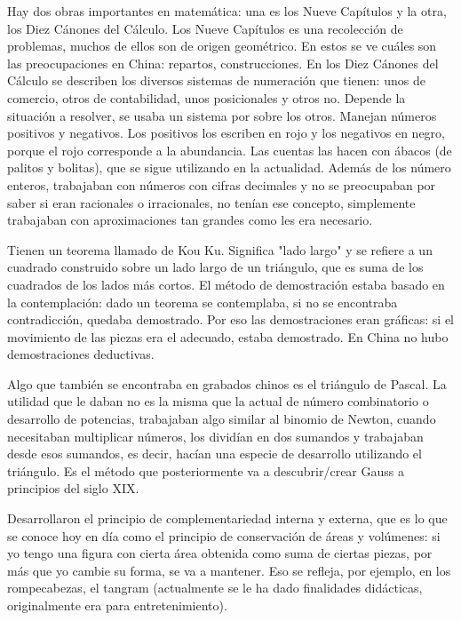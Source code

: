 Hay dos obras importantes en matemática: una es los Nueve Capítulos y la otra, los Diez Cánones del Cálculo. Los Nueve Capítulos es una recolección de problemas, muchos de ellos son de origen geométrico. En estos se ve cuáles son las preocupaciones en China: repartos, construcciones. En los Diez Cánones del Cálculo se describen los diversos sistemas de numeración que tienen: unos de comercio, otros de contabilidad, unos posicionales y otros no. Depende la situación a resolver, se usaba un sistema por sobre los otros. Manejan números positivos y negativos. Los positivos los escriben en rojo y los negativos en negro, porque el rojo corresponde a la abundancia. Las cuentas las hacen con ábacos (de palitos y bolitas), que se sigue utilizando en la actualidad.
Además de los número enteros, trabajaban con números con cifras decimales y no se preocupaban por saber si eran racionales o irracionales, no tenían ese concepto, simplemente trabajaban con aproximaciones tan grandes como les era necesario.

Tienen un teorema llamado de Kou Ku. Significa "lado largo" y se refiere a un cuadrado construido sobre un lado largo de un triángulo, que es suma de los cuadrados de los lados más cortos. El método de demostración estaba basado en la contemplación: dado un teorema se contemplaba, si no se encontraba contradicción, quedaba demostrado. Por eso las demostraciones eran gráficas: si el movimiento de las piezas era el adecuado, estaba demostrado. En China no hubo demostraciones deductivas.

Algo que también se encontraba en grabados chinos es el triángulo de Pascal. La utilidad que le daban no es la misma que la actual de número combinatorio o desarrollo de potencias, trabajaban algo similar al binomio de Newton, cuando necesitaban multiplicar números, los dividían en dos sumandos y trabajaban desde esos sumandos, es decir, hacían una especie de desarrollo utilizando el triángulo. Es el método que posteriormente va a descubrir/crear Gauss a principios del siglo XIX.

Desarrollaron el principio de complementariedad interna y externa, que es lo que se conoce hoy en día como el principio de conservación de áreas y volúmenes: si yo tengo una figura con cierta área obtenida como suma de ciertas piezas, por más que yo cambie su forma, se va a mantener. Eso se refleja, por ejemplo, en los rompecabezas, el tangram (actualmente se le ha dado finalidades didácticas, originalmente era para entretenimiento). 

